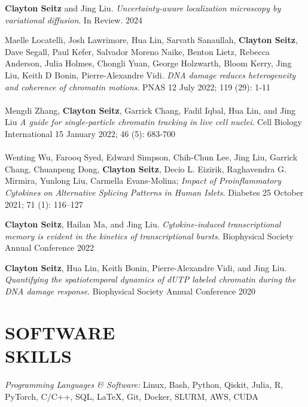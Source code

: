 \documentclass[margin, 10pt]{res} %
\begin{document}
\begin{resume}
\textbf{Clayton Seitz} and Jing Liu. \textit{Uncertainty-aware localization microscopy by variational diffusion}. In Review. 2024

Maelle Locatelli\textsuperscript{\textdagger}, Josh Lawrimore\textsuperscript{\textdagger}, Hua Lin\textsuperscript{\textdagger}, Sarvath Sanaullah, \textbf{Clayton Seitz}, Dave Segall, Paul Kefer, Salvador Moreno Naike, Benton Lietz, Rebecca Anderson, Julia Holmes, Chongli Yuan, George Holzwarth, Bloom Kerry, Jing Liu, Keith D Bonin, Pierre-Alexandre Vidi. \textit{DNA damage reduces heterogeneity and coherence of chromatin motions}. PNAS 12 July 2022; 119 (29): 1-11
\\
\\
Mengdi Zhang, \textbf{Clayton Seitz}, Garrick Chang, Fadil Iqbal, Hua Lin, and Jing Liu \textit{A guide for single-particle chromatin tracking in live cell nuclei}. Cell Biology International 15 January 2022; 46 (5): 683-700
\\
\\
Wenting Wu, Farooq Syed, Edward Simpson, Chih-Chun Lee, Jing Liu, Garrick Chang, Chuanpeng Dong, \textbf{Clayton Seitz}, Decio L. Eizirik, Raghavendra G. Mirmira, Yunlong Liu, Carmella Evans-Molina; \textit{Impact of Proinflammatory Cytokines on Alternative Splicing Patterns in Human Islets}. Diabetes 25 October 2021; 71 (1): 116–127

\textbf{Clayton Seitz}, Hailan Ma, and Jing Liu. \textit{Cytokine-induced transcriptional memory is evident in the kinetics of transcriptional bursts}. Biophysical Society Annual Conference 2022


\textbf{Clayton Seitz}, Hua Lin, Keith Bonin, Pierre-Alexandre Vidi, and Jing Liu. \textit{Quantifying the spatiotemporal dynamics of dUTP labeled chromatin during the DNA damage response}. Biophysical Society Annual Conference 2020


\section{SOFTWARE \\ SKILLS} 

{\sl Programming Languages \& Software:} 
Linux, Bash, Python, Qiskit, Julia, R, PyTorch, C/C++, SQL, LaTeX, Git, Docker, SLURM, AWS, CUDA\\

\end{resume}
\end{document}
